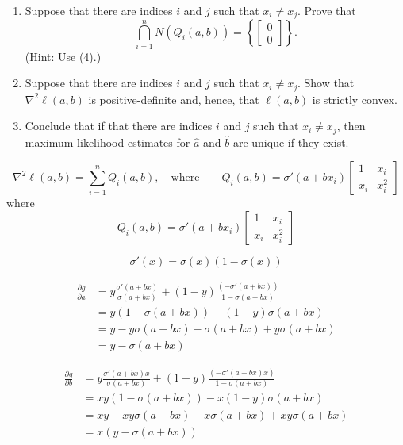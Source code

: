 \documentclass[12pt]{amsart}
\begin{document}
\begin{enumerate}
    \item Suppose that there are indices $i$ and $j$ such that $x_i\neq x_j$.
    Prove that
    \[
        \bigcap_{i=1}^n N(Q_i(a,b)) = \left\{
            \begin{bmatrix}
                0\\0
            \end{bmatrix}
            \right\}.
    \]
    (Hint: Use (4).)

    \item Suppose that there are indices $i$ and $j$ such that $x_i\neq x_j$.
    Show that $\nabla^2 \ell(a,b)$ is positive-definite and, hence, that $\ell(a,b)$ is strictly convex.
    
    \item Conclude that if that there are indices $i$ and $j$ such that $x_i\neq x_j$, then
    maximum likelihood estimates for $\hat a$ and $\hat b$ are unique if they exist.
\end{enumerate}

\[
    \nabla^2 \ell(a, b) = \sum_{i=1}^n Q_i(a,b),\quad\text{where}\qquad
    Q_i(a,b) = \sigma'(a+bx_i)\begin{bmatrix}
        1 & x_i\\
        x_i & x_i^2
    \end{bmatrix}
\]
where
\[
    Q_i(a,b) = \sigma'(a+bx_i)\begin{bmatrix}
        1 & x_i\\
        x_i & x_i^2
    \end{bmatrix}
\]

\[
    \sigma'(x) = \sigma(x)(1-\sigma(x))
\]

\begin{align*}
    \frac{\partial g}{\partial a} &= y\frac{\sigma'(a + bx)}{\sigma(a + bx)} + (1-y)\frac{(-\sigma'(a + bx))}{1-\sigma(a + bx)}\\
    &= y(1-\sigma(a + bx)) - (1-y)\sigma(a + bx)\\
    &= y - y\sigma(a + bx) - \sigma(a + bx) + y\sigma(a + bx)\\
    &= y-\sigma(a + bx)
\end{align*}


\begin{align*}
    \frac{\partial g}{\partial b} &= y\frac{\sigma'(a + bx)x}{\sigma(a + bx)} + (1-y)\frac{(-\sigma'(a + bx)x)}{1-\sigma(a + bx)}\\
    &= xy(1-\sigma(a + bx)) - x(1-y)\sigma(a + bx)\\
    &= xy - xy\sigma(a + bx) - x\sigma(a + bx) + xy\sigma(a + bx)\\
    &= x(y-\sigma(a + bx))
\end{align*}
\end{document}
